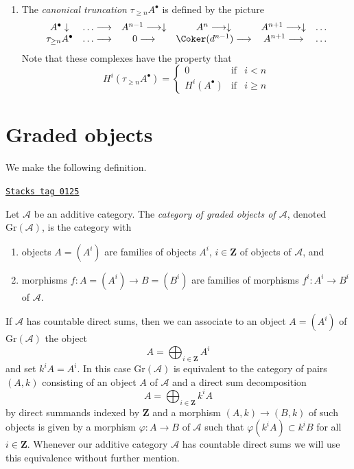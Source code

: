 \begin{enumerate}
$$\begin{matrix}
H^i(A^\bullet) & \text{if} & i \leq n \\
0 & \text{if} & i > n
\end{matrix}
\right.
$$
\item The {\it canonical truncation} $\tau_{\geq n}A^\bullet$
is defined by the picture
$$
\begin{array}{cccccc}A^\bullet \downarrow & \ldots \longrightarrow & A^{n - 1} \longrightarrow\downarrow & A^n \longrightarrow\downarrow & A^{n + 1} \longrightarrow\downarrow & \ldots \\ \tau_{\geq n}A^\bullet & \ldots \longrightarrow & 0 \longrightarrow & \Coker(d^{n - 1}) \longrightarrow & A^{n + 1} \longrightarrow & \ldots\end{array}
$$
Note that these complexes have the property that
$$
H^i(\tau_{\geq n}A^\bullet) =
\left\{
\begin{matrix}
0 & \text{if} & i < n \\
H^i(A^\bullet) & \text{if} & i \geq n
\end{matrix}
\right.
$$
\end{enumerate}

\section{Graded objects}
\label{homology-section-graded}
We make the following definition.

\begin{definition}[Graded]
\label{homology-definition-graded}
\href{https://stacks.math.columbia.edu/tag/0125}{\texttt{Stacks tag 0125}}

Let $\mathcal{A}$ be an additive category. The {\it category of graded
objects of $\mathcal{A}$}, denoted $\text{Gr}(\mathcal{A})$, is
the category with
\begin{enumerate}
\item objects $A = (A^i)$ are families of objects $A^i$, $i \in \mathbf{Z}$
of objects of $\mathcal{A}$, and
\item morphisms $f : A = (A^i) \to B = (B^i)$ are families of
morphisms $f^i : A^i \to B^i$ of $\mathcal{A}$.
\end{enumerate}
\end{definition}

If $\mathcal{A}$ has countable direct sums, then we can associate to
an object $A = (A^i)$ of $\text{Gr}(\mathcal{A})$ the object
$$
A = \bigoplus\nolimits_{i \in \mathbf{Z}} A^i
$$
and set $k^iA = A^i$. In this case $\text{Gr}(\mathcal{A})$ is equivalent
to the category of pairs $(A, k)$ consisting of an object $A$ of
$\mathcal{A}$ and a direct sum decomposition
$$
A = \bigoplus\nolimits_{i \in \mathbf{Z}} k^iA
$$
by direct summands indexed by $\mathbf{Z}$ and a morphism $(A, k) \to (B, k)$
of such objects is given by a morphism $\varphi : A \to B$ of $\mathcal{A}$
such that $\varphi(k^iA) \subset k^iB$ for all $i \in \mathbf{Z}$. Whenever
our additive category $\mathcal{A}$ has countable direct sums we will
use this equivalence without further mention.

